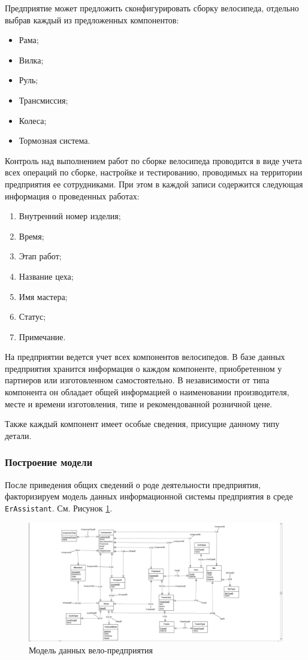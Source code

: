 \documentclass[a4paper,14pt]{extarticle}
\newcommand{\erassistant}{\texttt{ErAssistant}}
\begin{document}
Предприятие может предложить сконфигурировать сборку велосипеда, отдельно выбрав каждый из предложенных компонентов:
\begin{itemize}
	\item Рама;
	\item Вилка;
	\item Руль;
	\item Трансмиссия;
	\item Колеса;
	\item Тормозная система.
\end{itemize}

Контроль над выполнением работ по сборке велосипеда проводится в виде учета всех операций по сборке, настройке и тестированию, проводимых на территории предприятия ее сотрудниками. При этом в каждой записи содержится следующая информация о проведенных работах:
\begin{enumerate}
	\item Внутренний номер изделия;
	\item Время;
	\item Этап работ;
	\item Название цеха;
	\item Имя мастера;
	\item Статус;
	\item Примечание.
\end{enumerate}

На предприятии ведется учет всех компонентов велосипедов.
В базе данных предприятия хранится информация о каждом компоненте, приобретенном у партнеров или изготовленном самостоятельно. В независимости от типа компонента он обладает общей информацией о наименовании производителя, месте и времени изготовления, типе и рекомендованной розничной цене. 

Также каждый компонент имеет особые сведения, присущие данному типу детали.

\subsubsection*{Построение модели}
После приведения общих сведений о роде деятельности предприятия, факторизируем модель данных информационной системы предприятия в среде \erassistant. См. Рисунок \ref{fig:1-cycle}.
\begin{figure}[hpbt]
	\centering
	\includegraphics[width=1\linewidth]{images/1-cycle}
	\caption{Модель данных вело-предприятия}
	\label{fig:1-cycle}
\end{figure}
\end{document}
